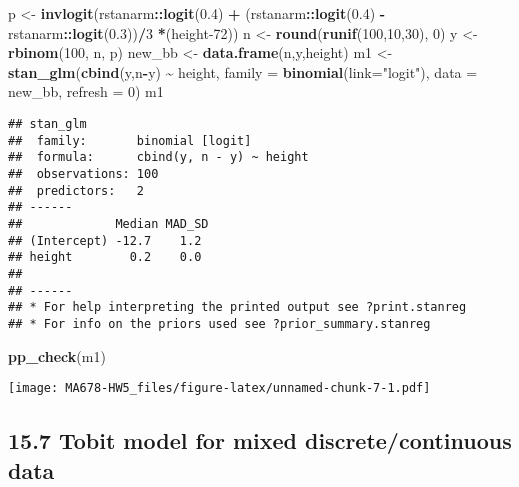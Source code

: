 \documentclass[
]{article}
\newenvironment{Shaded}{\begin{snugshade}}{\end{snugshade}}
\newcommand{\AttributeTok}[1]{\textcolor[rgb]{0.13,0.29,0.53}{#1}}
\newcommand{\DecValTok}[1]{\textcolor[rgb]{0.00,0.00,0.81}{#1}}
\newcommand{\FloatTok}[1]{\textcolor[rgb]{0.00,0.00,0.81}{#1}}
\newcommand{\FunctionTok}[1]{\textcolor[rgb]{0.13,0.29,0.53}{\textbf{#1}}}
\newcommand{\NormalTok}[1]{#1}
\newcommand{\OtherTok}[1]{\textcolor[rgb]{0.56,0.35,0.01}{#1}}
\newcommand{\SpecialCharTok}[1]{\textcolor[rgb]{0.81,0.36,0.00}{\textbf{#1}}}
\newcommand{\StringTok}[1]{\textcolor[rgb]{0.31,0.60,0.02}{#1}}
\begin{document}
\begin{Shaded}
\begin{Highlighting}[]
\NormalTok{p }\OtherTok{\textless{}{-}} \FunctionTok{invlogit}\NormalTok{(rstanarm}\SpecialCharTok{::}\FunctionTok{logit}\NormalTok{(}\FloatTok{0.4}\NormalTok{) }\SpecialCharTok{+}\NormalTok{ (rstanarm}\SpecialCharTok{::}\FunctionTok{logit}\NormalTok{(}\FloatTok{0.4}\NormalTok{) }\SpecialCharTok{{-}}\NormalTok{ rstanarm}\SpecialCharTok{::}\FunctionTok{logit}\NormalTok{(}\FloatTok{0.3}\NormalTok{))}\SpecialCharTok{/}\DecValTok{3} \SpecialCharTok{*}\NormalTok{(height}\DecValTok{{-}72}\NormalTok{))}
\NormalTok{n }\OtherTok{\textless{}{-}} \FunctionTok{round}\NormalTok{(}\FunctionTok{runif}\NormalTok{(}\DecValTok{100}\NormalTok{,}\DecValTok{10}\NormalTok{,}\DecValTok{30}\NormalTok{), }\DecValTok{0}\NormalTok{)}
\NormalTok{y }\OtherTok{\textless{}{-}} \FunctionTok{rbinom}\NormalTok{(}\DecValTok{100}\NormalTok{, n, p)}
\NormalTok{new\_bb }\OtherTok{\textless{}{-}} \FunctionTok{data.frame}\NormalTok{(n,y,height)}
\NormalTok{m1 }\OtherTok{\textless{}{-}} \FunctionTok{stan\_glm}\NormalTok{(}\FunctionTok{cbind}\NormalTok{(y,n}\SpecialCharTok{{-}}\NormalTok{y) }\SpecialCharTok{\textasciitilde{}}\NormalTok{ height, }\AttributeTok{family =} \FunctionTok{binomial}\NormalTok{(}\AttributeTok{link=}\StringTok{"logit"}\NormalTok{), }\AttributeTok{data =}\NormalTok{ new\_bb, }\AttributeTok{refresh =} \DecValTok{0}\NormalTok{) }
\NormalTok{m1}
\end{Highlighting}
\end{Shaded}

\begin{verbatim}
## stan_glm
##  family:       binomial [logit]
##  formula:      cbind(y, n - y) ~ height
##  observations: 100
##  predictors:   2
## ------
##             Median MAD_SD
## (Intercept) -12.7    1.2 
## height        0.2    0.0 
## 
## ------
## * For help interpreting the printed output see ?print.stanreg
## * For info on the priors used see ?prior_summary.stanreg
\end{verbatim}

\begin{Shaded}
\begin{Highlighting}[]
\FunctionTok{pp\_check}\NormalTok{(m1)}
\end{Highlighting}
\end{Shaded}

\texttt{[image: MA678-HW5\_files/figure-latex/unnamed-chunk-7-1.pdf]}

\hypertarget{tobit-model-for-mixed-discretecontinuous-data}{%
\subsection{15.7 Tobit model for mixed discrete/continuous
data}\label{tobit-model-for-mixed-discretecontinuous-data}}
\end{document}
